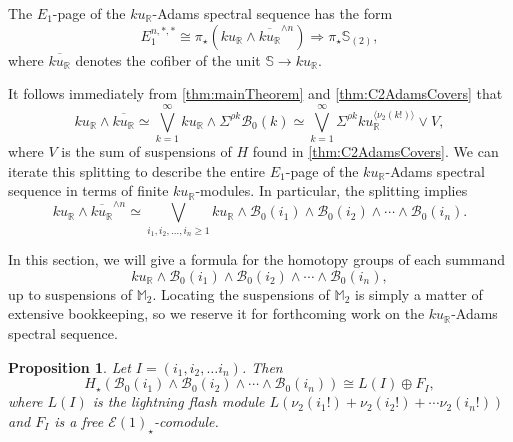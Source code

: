 \documentclass{amsart}
\newtheorem{proposition}[equation]{Proposition}
\theoremstyle{plain}
\numberwithin{equation}{section}
\numberwithin{figure}{section}
\newcommand{\mM}{{\mathbb M}}
\newcommand{\mR}{{\mathbb R}}
\newcommand{\cB}{{\mathcal B}}
\newcommand{\cE}{{\mathcal E}}
\newcommand{\0}{\langle 0 \rangle }
\begin{document}
The $E_{1}$-page of the $ku_{\mR}$-Adams spectral sequence has the form
\[ E_{1}^{n,*,*}\cong \pi_{\star}\left( ku_{\mR}\wedge \overline{ku_{\mR}}^{\wedge n}\right) \Longrightarrow \pi_{\star}\mathbb{S}_{(2)} ,\]
where $\overline{ku_{\mR}}$ denotes the cofiber of the unit $\mathbb{S} \to ku_{\mR}$. 

It follows immediately from \cref{thm:mainTheorem} and \cref{thm:C2AdamsCovers} that 
\[
ku_{\mR} \wedge \overline{ku_{\mR}} \simeq \bigvee\limits_{k=1}^{\infty} ku_{\mR} \wedge \Sigma^{\rho k} \cB_{0}(k) \simeq \bigvee\limits_{k=1}^{\infty} \Sigma^{\rho k}ku_{\mR}^{\langle \nu_{2}(k!)   \rangle } \vee V,
\]
where $V$ is the sum of suspensions of $H$ found in \cref{thm:C2AdamsCovers}. We can iterate this splitting to describe the entire $E_{1}$-page of the $ku_{\mR}$-Adams spectral sequence in terms of finite $ku_{\mR}$-modules. In particular, the splitting implies
 $$ku_{\mR}\wedge \overline{ku_{\mR}}^{\wedge n} \simeq \bigvee\limits_{i_{1},i_{2}, \ldots, i_{n} \ge 1} ku_{\mR} \wedge \cB_{0}(i_{1}) \wedge \cB_{0}(i_{2}) \wedge \cdots \wedge \cB_{0}(i_{n}) .$$

In this section, we will give a formula for the homotopy groups of each summand 
\[
ku_{\mR} \wedge \cB_{0}(i_{1}) \wedge \cB_{0}(i_{2}) \wedge \cdots \wedge \cB_{0}(i_{n}),
\]
up to suspensions of $\mM_{2}$. Locating the suspensions of $\mM_{2}$ is simply a matter of extensive bookkeeping, so we reserve it for forthcoming work on the $ku_\mR$-Adams spectral sequence. 

\begin{proposition}
Let $I = (i_{1}, i_{2}, \ldots i_{n})$. Then \[ H_{\star}\left(\cB_{0}(i_{1}) \wedge \cB_{0}(i_{2}) \wedge \cdots \wedge \cB_{0}(i_{n}) \right) \cong L(I) \oplus F_{I},\]
where $L(I)$ is the lightning flash module $L(\nu_{2}(i_{1}!) + \nu_{2}(i_{2}!) + \cdots \nu_{2}(i_{n}!))$ and $F_{I}$ is a free $\cE(1)_{\star}$-comodule.
\end{proposition}
\end{document}
